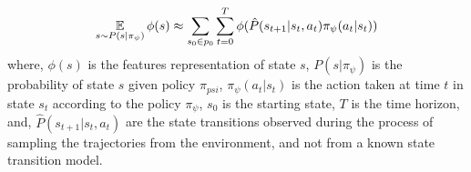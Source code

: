 \begin{align}
\label{eq:svf-sampling}
   \operatorname*{\mathbb{E}}_{s \sim P(s|\pi_\psi)} \phi(s) \approx \sum_{s_0 \in p_0} \sum_{t=0}^{T} \phi(\hat{P}(s_{t+1}|s_t, a_t)\pi_\psi(a_t|s_t))
\end{align}
where, $\phi(s)$ is the features representation of state $s$, $P(s|\pi_{\psi})$ is the probability of state $s$ given policy $\pi_{psi}$, $\pi_{\psi}(a_{t}|s_{t})$ is the action taken at time $t$ in state $s_{t}$ according to the policy $\pi_{\psi}$, $s_{0}$ is the starting state, $T$ is the time horizon, and, $\hat{P}(s_{t+1}| s_{t}, a_{t})$ are the state transitions observed during the process of sampling the trajectories from the environment, and not from a known state transition model.
